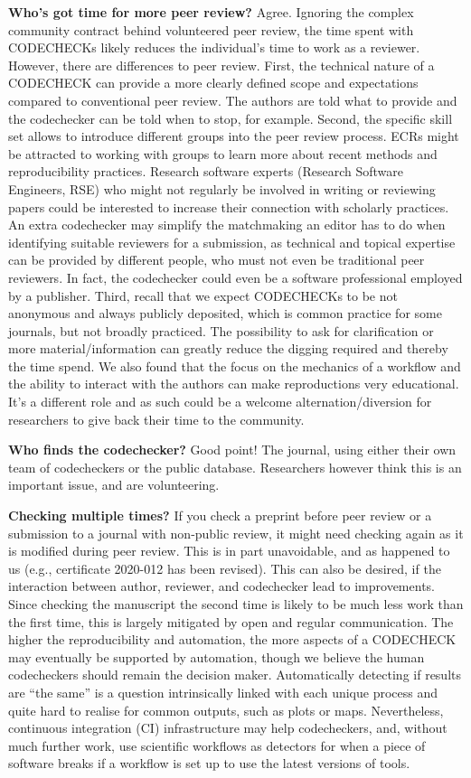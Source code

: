 \documentclass[12pt]{article}
\begin{document}
\textbf{Who's got time for more peer review?} Agree.
Ignoring the complex community contract behind volunteered peer review,
the time spent with CODECHECKs likely reduces the individual's time to work
as a reviewer.
However, there are differences to peer review.
First, the technical nature of a CODECHECK can provide a more 
clearly defined scope and expectations compared to conventional 
peer review. The authors are told what to provide and the codechecker
can be told when to stop, for example.
Second, the specific skill set allows to introduce different groups
into the peer review process. ECRs might be attracted to working with
groups to learn more about recent methods and reproducibility practices.
Research software experts (Research Software Engineers, RSE) who might
not regularly be involved in writing or reviewing papers could be 
interested to increase their connection with scholarly practices.
An extra codechecker may simplify the matchmaking an editor has to do
when identifying suitable reviewers for a submission, as technical and
topical expertise can be provided by different people, who must not even
be traditional peer reviewers. In fact, the codechecker could even be
a software professional employed by a publisher.
Third, recall that we expect CODECHECKs to be not anonymous and always
publicly deposited, which is common practice for some journals, but not
broadly practiced. The possibility to ask for clarification or more 
material/information can greatly reduce the digging required and thereby
the time spend.
We also found that the focus on the mechanics of a
workflow and the ability to interact with the authors can make
reproductions very educational. It's a different role and as such could
be a welcome alternation/diversion for researchers to give back their 
time to the community.

\textbf{Who finds the codechecker?} Good point! The journal, using either
their own team of codecheckers or the public database. Researchers
however think this is an important issue, and are volunteering.


\textbf{Checking multiple times?} If you check a preprint before peer
review or a submission to a journal with non-public review, it might
need checking again as it is modified during peer review.  This is in
part unavoidable, and as happened to us (e.g., certificate 2020-012
\cite{cert-2020-012} has been revised). This can also be desired, if
the interaction between author, reviewer, and codechecker lead to
improvements.  Since checking the manuscript the second time is likely
to be much less work than the first time, this is largely mitigated by
open and regular communication.  The higher the reproducibility and
automation, the more aspects of a CODECHECK may eventually be
supported by automation, though we believe the human codecheckers
should remain the decision maker.  Automatically detecting if results
are ``the same'' is a question intrinsically linked with each unique
process and quite hard to realise for common outputs, such as plots or
maps.  Nevertheless, continuous integration (CI) infrastructure may
help codecheckers, and, without much further work, use scientific
workflows as detectors for when a piece of software breaks if a
workflow is set up to use the latest versions of tools.
\end{document}
